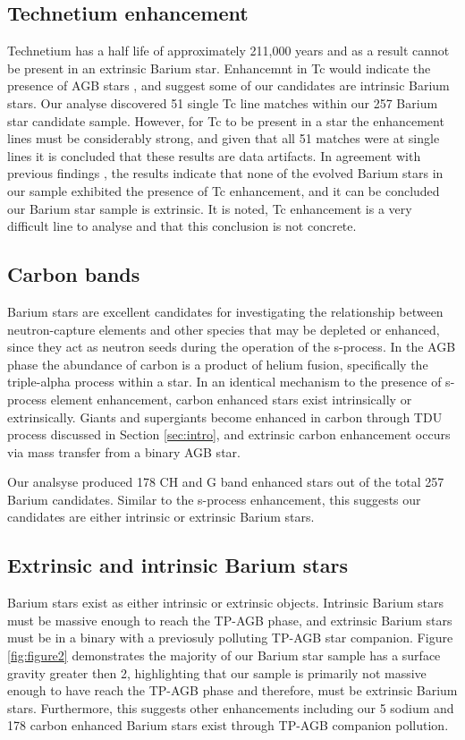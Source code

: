 \documentclass[a4paper,fleqn,usenatbib]{mnras}
\begin{document}
\subsection{Technetium enhancement}
Technetium has a half life of approximately 211,000 years and as a result cannot be present in an extrinsic Barium star. Enhancemnt in Tc would indicate the presence of AGB stars \citep{jorissen1993}, and suggest some of our candidates are intrinsic Barium stars. Our analyse discovered 51 single Tc line matches within our 257 Barium star candidate sample. However, for Tc to be present in  a star the enhancement lines must be considerably strong, and given that all 51 matches were at single lines it is concluded that these results are data artifacts. In agreement with previous findings \citep[e.g.][]{little1987,smith1984,smith1983}, the results indicate that none of the evolved Barium stars in our sample exhibited the presence of Tc enhancement, and it can be concluded our Barium star sample is extrinsic. It is noted, Tc enhancement is a very difficult line to analyse and that this conclusion is not concrete.

\subsection{Carbon bands}
Barium stars are excellent candidates for investigating the relationship between neutron-capture elements and other species that may be depleted or enhanced, since they act as neutron seeds during the operation of the s-process. In the AGB phase the abundance of carbon is a product of helium fusion, specifically the triple-alpha process within a star. In an identical mechanism to the presence of s-process element enhancement, carbon enhanced stars exist intrinsically or extrinsically. Giants and supergiants become enhanced in carbon through TDU process discussed in Section \ref{sec:intro}, and extrinsic carbon enhancement occurs via mass transfer from a binary AGB star. 

Our analsyse produced 178 CH and G band enhanced stars out of the total 257 Barium candidates. Similar to the s-process enhancement, this suggests our candidates are either intrinsic or extrinsic Barium stars.

\subsection{Extrinsic and intrinsic Barium stars}
Barium stars exist as either intrinsic or extrinsic objects. Intrinsic Barium stars must be massive enough to reach the TP-AGB phase, and extrinsic Barium stars must be in a binary with a previosuly polluting TP-AGB star companion. Figure \ref{fig:figure2} demonstrates the majority of our Barium star sample has a surface gravity greater then 2, highlighting that our sample is primarily not massive enough to have reach the TP-AGB phase and therefore, must be extrinsic Barium stars. Furthermore, this suggests other enhancements including our 5 sodium and 178 carbon enhanced Barium stars exist through TP-AGB companion pollution.
\end{document}
